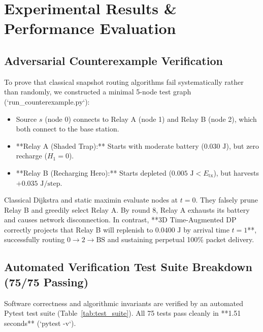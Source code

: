 \documentclass[journal]{IEEEtran}
\begin{document}
\section{Experimental Results \& Performance Evaluation}

\subsection{Adversarial Counterexample Verification}
To prove that classical snapshot routing algorithms fail systematically rather than randomly, we constructed a minimal 5-node test graph (`run_counterexample.py`):
\begin{itemize}
    \item Source $s$ (node 0) connects to Relay A (node 1) and Relay B (node 2), which both connect to the base station.
    \item **Relay A (Shaded Trap):** Starts with moderate battery ($0.030\text{ J}$), but zero recharge ($H_1 = 0$).
    \item **Relay B (Recharging Hero):** Starts depleted ($0.005\text{ J} < E_{\text{tx}}$), but harvests $+0.035\text{ J/step}$.
\end{itemize}
Classical Dijkstra and static maximin evaluate nodes at $t = 0$. They falsely prune Relay B and greedily select Relay A. By round 8, Relay A exhausts its battery and causes network disconnection. In contrast, **3D Time-Augmented DP correctly projects that Relay B will replenish to $0.0400\text{ J}$ by arrival time $t=1$**, successfully routing $0 \to 2 \to \text{BS}$ and sustaining perpetual 100\% packet delivery.

\subsection{Automated Verification Test Suite Breakdown (75/75 Passing)}
Software correctness and algorithmic invariants are verified by an automated Pytest test suite (Table~\ref{tab:test_suite}). All 75 tests pass cleanly in **1.51 seconds** (`pytest -v`).
\end{document}
